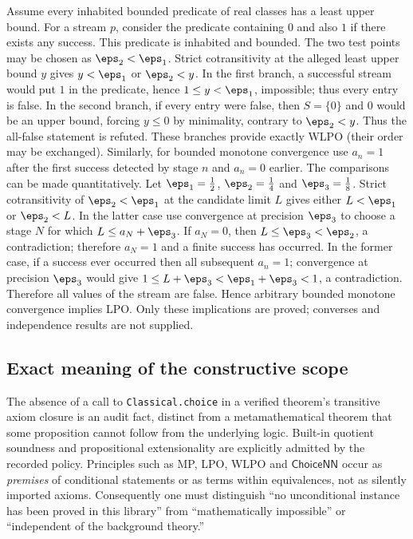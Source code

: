 Assume every inhabited bounded predicate of real classes has a least upper bound. For a stream $p$, consider the predicate containing $0$ and also $1$ if there exists any success. This predicate is inhabited and bounded. The two test points may be chosen as $\eps_2<\eps_1$. Strict cotransitivity at the alleged least upper bound $y$ gives $y<\eps_1$ or $\eps_2<y$. In the first branch, a successful stream would put $1$ in the predicate, hence $1\le y<\eps_1$, impossible; thus every entry is false. In the second branch, if every entry were false, then $S=\{0\}$ and $0$ would be an upper bound, forcing $y\le0$ by minimality, contrary to $\eps_2<y$. Thus the all-false statement is refuted. These branches provide exactly WLPO (their order may be exchanged). Similarly, for bounded monotone convergence use $a_n=1$ after the first success detected by stage $n$ and $a_n=0$ earlier. The comparisons can be made quantitatively. Let $\eps_1=\frac12$, $\eps_2=\frac14$ and $\eps_3=\frac18$. Strict cotransitivity of $\eps_2<\eps_1$ at the candidate limit $L$ gives either $L<\eps_1$ or $\eps_2<L$. In the latter case use convergence at precision $\eps_3$ to choose a stage $N$ for which $L\le a_N+\eps_3$. If $a_N=0$, then $L\le\eps_3<\eps_2$, a contradiction; therefore $a_N=1$ and a finite success has occurred. In the former case, if a success ever occurred then all subsequent $a_n=1$; convergence at precision $\eps_3$ would give $1\le L+\eps_3<\eps_1+\eps_3<1$, a contradiction. Therefore all values of the stream are false. Hence arbitrary bounded monotone convergence implies LPO. Only these implications are proved; converses and independence results are not supplied.

\subsection{Exact meaning of the constructive scope}\label{supp:14-5}
\par{}\par\smallskip

The absence of a call to \texttt{Classical.choice} in a verified theorem's transitive axiom closure is an audit fact, distinct from a metamathematical theorem that some proposition cannot follow from the underlying logic. Built-in quotient soundness and propositional extensionality are explicitly admitted by the recorded policy. Principles such as MP, LPO, WLPO and $\mathsf{ChoiceNN}$ occur as \emph{premises} of conditional statements or as terms within equivalences, not as silently imported axioms. Consequently one must distinguish ``no unconditional instance has been proved in this library'' from ``mathematically impossible'' or ``independent of the background theory.''

